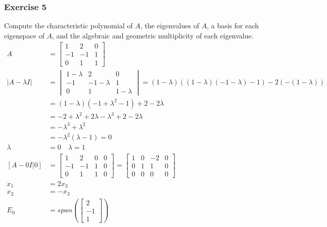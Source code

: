 \documentclass{math}
\begin{document}
\subsubsection*{Exercise 5}
Compute the characteristic polynomial of \( A \), the eigenvalues of \( A \),
a basis for each eigenspace of \( A \), and the algebraic and geometric
multiplicity of each eigenvalue.
\begin{align*}
  A &= \begin{bmatrix}
    1 & 2 & 0 \\
    -1 & -1 & 1 \\
    0 & 1 & 1
  \end{bmatrix} \\
  |A-\lambda I| &= \begin{vmatrix}
    1-\lambda & 2 & 0 \\
    -1 & -1-\lambda & 1 \\
    0 & 1 & 1-\lambda
  \end{vmatrix} = (1-\lambda)((1-\lambda)(-1-\lambda)-1)-2(-(1-\lambda)) \\
  &= (1-\lambda)(-1+\lambda^2-1)+2-2\lambda \\
  &= -2+\lambda^2+2\lambda-\lambda^3+2-2\lambda \\
  &= -\lambda^3+\lambda^2 \\
  &= -\lambda^2(\lambda-1) = 0 \\
  \lambda &= 0 \quad \lambda = 1 \\
  [A-0I|0] &= \begin{bmatrix}
    1 & 2 & 0 & 0 \\
    -1 & -1 & 1 & 0 \\
    0 & 1 & 1 & 0
  \end{bmatrix} = \begin{bmatrix}
    1 & 0 & -2 & 0 \\
    0 & 1 & 1 & 0 \\
    0 & 0 & 0 & 0
  \end{bmatrix} \\
  x_1 &= 2x_3 \\
  x_2 &= -x_3 \\
  E_0 &= span\left(\begin{bmatrix}2 \\ -1 \\ 1\end{bmatrix}\right)
\end{align*}
\end{document}
